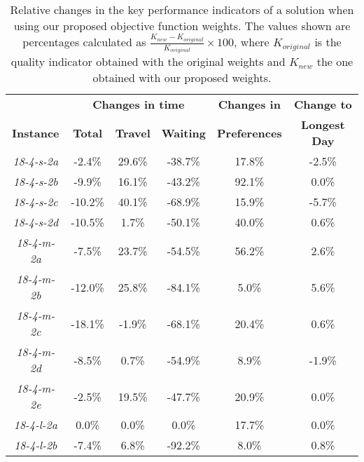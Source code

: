 \begin{table}[htbp!]
    \centering
    \caption{Relative changes in the key performance indicators of a solution when using our proposed objective function weights. The values shown are percentages calculated as $\frac{K_{new} - K_{original}}{K_{original}}\times 100$, where $K_{original}$ is the quality indicator obtained with the original weights and $K_{new}$ the one obtained with our proposed weights.}
    \begin{tabular}{cccccc}
    \hline
   &   \multicolumn{3}{c}{\textbf{Changes in time}}   &   \textbf{Changes in}    &   \textbf{Change to}    \\
   \textbf{Instance}    &   \textbf{Total} &   \textbf{Travel}    &   \textbf{Waiting}   &   \textbf{Preferences}    &   \textbf{Longest Day}    \\ \hline
\emph{18-4-s-2a}    &   -2.4\%   &   29.6\%   &   -38.7\%  &   17.8\%   &   -2.5\%   \\
\emph{18-4-s-2b}    &   -9.9\%   &   16.1\%   &   -43.2\%  &   92.1\%   &   0.0\%    \\
\emph{18-4-s-2c}    &   -10.2\%  &   40.1\%   &   -68.9\%  &   15.9\%   &   -5.7\%   \\
\emph{18-4-s-2d}    &   -10.5\%  &   1.7\%    &   -50.1\%  &   40.0\%   &   0.6\%    \\
\emph{18-4-m-2a}    &   -7.5\%   &   23.7\%   &   -54.5\%  &   56.2\%   &   2.6\%    \\
\emph{18-4-m-2b}    &   -12.0\%  &   25.8\%   &   -84.1\%  &   5.0\%    &   5.6\%    \\
\emph{18-4-m-2c}    &   -18.1\%  &   -1.9\%   &   -68.1\%  &   20.4\%   &   0.6\%    \\
\emph{18-4-m-2d}    &   -8.5\%   &   0.7\%    &   -54.9\%  &   8.9\%    &   -1.9\%   \\
\emph{18-4-m-2e}    &   -2.5\%   &   19.5\%   &   -47.7\%  &   20.9\%   &   0.0\%    \\
\emph{18-4-l-2a}    &   0.0\%    &   0.0\%    &   0.0\%    &   17.7\%   &   0.0\%    \\
\emph{18-4-l-2b}    &   -7.4\%   &   6.8\%    &   -92.2\%  &   8.0\%    &   0.8\%    \\

\end{tabular}
\end{table}
